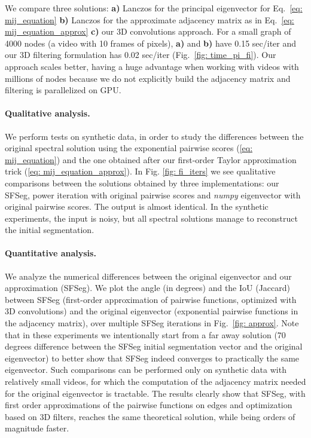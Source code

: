 \documentclass{article}
\begin{document}
We compare three solutions: \textbf{a)} Lanczos for the principal eigenvector for Eq.~\ref{eq: mij_equation} \textbf{b)} Lanczos for the approximate adjacency matrix as in Eq.~\ref{eq: mij_equation_approx} \textbf{c)} our 3D convolutions approach. For a small graph of 4000 nodes (a video with 10 frames of  pixels), \textbf{a)} and \textbf{b)} have 0.15 sec/iter and our 3D filtering formulation has 0.02 sec/iter (Fig.~\ref{fig: time_pi_fi}). Our approach scales better, having a huge advantage when working with videos with millions of nodes because we do not explicitly build the adjacency matrix and filtering is parallelized on GPU.



\paragraph{Qualitative analysis.} We perform tests on synthetic data, in order to study the differences between the original spectral solution using the exponential pairwise scores (\ref{eq: mij_equation}) and the one obtained after our first-order Taylor approximation trick (\ref{eq: mij_equation_approx}). In Fig. \ref{fig: fi_iters} we see qualitative comparisons between the solutions obtained by three implementations: our SFSeg, power iteration with original pairwise scores and \textit{numpy} eigenvector with original pairwise scores. The output is almost identical. In the synthetic experiments, the input is noisy, but all spectral solutions manage to reconstruct the initial segmentation. 



\paragraph{Quantitative analysis.} We analyze the numerical differences between the original eigenvector and our approximation (SFSeg). We plot the angle (in degrees) and the IoU (Jaccard) between SFSeg (first-order approximation of pairwise functions, optimized with 3D convolutions) and the original eigenvector (exponential pairwise functions in the adjacency matrix), over multiple SFSeg iterations in Fig.~\ref{fig: approx}. Note that in these experiments we intentionally start from a far away solution (70 degrees difference between the SFSeg initial segmentation vector and the original eigenvector) to better show that SFSeg indeed converges to practically the same eigenvector.
Such comparisons can be performed only on synthetic data with relatively small videos, for which the computation of the adjacency matrix needed for the original eigenvector is tractable. The results clearly show that SFSeg, with first order approximations of the pairwise functions on edges and optimization based on 3D filters, reaches the same theoretical solution, while being orders of magnitude faster.
\end{document}

